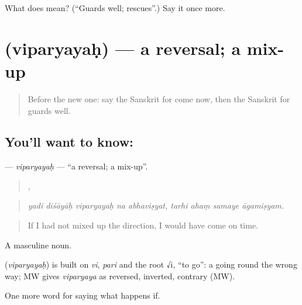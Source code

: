 \begin{tcolorbox}[breakable,colback=teal!4,colframe=teal!35!black,title={Before you move on}]
What does  mean? (\textquotedblleft{}Guards well; rescues\textquotedblright{}.) Say it once more.
\end{tcolorbox}
\section[\texorpdfstring{\sk{विपर्ययः} (viparyayaḥ)}{विपर्ययः (viparyayaḥ)}]{ (viparyayaḥ) — a reversal; a mix-up}

\label{lesson:SA-C553-viparyayah}



\begin{quote}
Before the new one: say the Sanskrit for come now, then the Sanskrit for guards well.
\end{quote}

\subsection*{You'll want to know: }
\textbf{} — \emph{viparyayaḥ} — \textquotedblleft{}a reversal; a mix-up\textquotedblright{}.

\begin{quote}
    ,    
\end{quote}

\begin{quote}
\emph{yadi diśāyāḥ viparyayaḥ na abhaviṣyat, tarhi ahaṃ samaye āgamiṣyam.}
\end{quote}

\begin{quote}
If I had not mixed up the direction, I would have come on time.
\end{quote}

A masculine noun.

\begin{cousinweb}
\textbf{} (\emph{viparyayaḥ}) is built on \emph{vi}, \emph{pari} and the root √i, \textquotedblleft{}to go\textquotedblright{}: a going round the wrong way; MW gives \emph{viparyaya} as reversed, inverted, contrary (MW).
\end{cousinweb}

\begin{grammarlens}[title={What you've built}]
One more word for saying what happens if.
\end{grammarlens}

